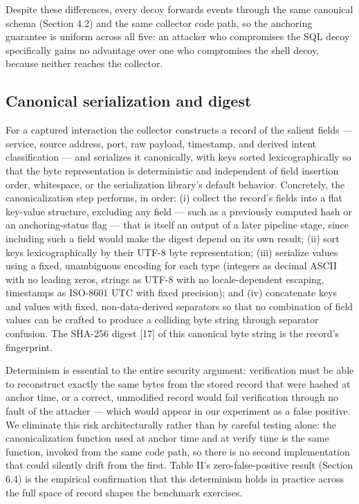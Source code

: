 \documentclass[journal]{IEEEtran}
\begin{document}
Despite these differences, every decoy forwards events through the same canonical schema (Section 4.2) and the same collector code path, so the anchoring guarantee is uniform across all five: an attacker who compromises the SQL decoy specifically gains no advantage over one who compromises the shell decoy, because neither reaches the collector.

\subsection{Canonical serialization and digest}

For a captured interaction the collector constructs a record of the salient fields --- service, source address, port, raw payload, timestamp, and derived intent classification --- and serializes it canonically, with keys sorted lexicographically so that the byte representation is deterministic and independent of field insertion order, whitespace, or the serialization library's default behavior. Concretely, the canonicalization step performs, in order: (i) collect the record's fields into a flat key-value structure, excluding any field --- such as a previously computed hash or an anchoring-status flag --- that is itself an output of a later pipeline stage, since including such a field would make the digest depend on its own result; (ii) sort keys lexicographically by their UTF-8 byte representation; (iii) serialize values using a fixed, unambiguous encoding for each type (integers as decimal ASCII with no leading zeros, strings as UTF-8 with no locale-dependent escaping, timestamps as ISO-8601 UTC with fixed precision); and (iv) concatenate keys and values with fixed, non-data-derived separators so that no combination of field values can be crafted to produce a colliding byte string through separator confusion. The SHA-256 digest [17] of this canonical byte string is the record's fingerprint.

Determinism is essential to the entire security argument: verification must be able to reconstruct exactly the same bytes from the stored record that were hashed at anchor time, or a correct, unmodified record would fail verification through no fault of the attacker --- which would appear in our experiment as a false positive. We eliminate this risk architecturally rather than by careful testing alone: the canonicalization function used at anchor time and at verify time is the same function, invoked from the same code path, so there is no second implementation that could silently drift from the first. Table II's zero-false-positive result (Section 6.4) is the empirical confirmation that this determinism holds in practice across the full space of record shapes the benchmark exercises.
\end{document}
